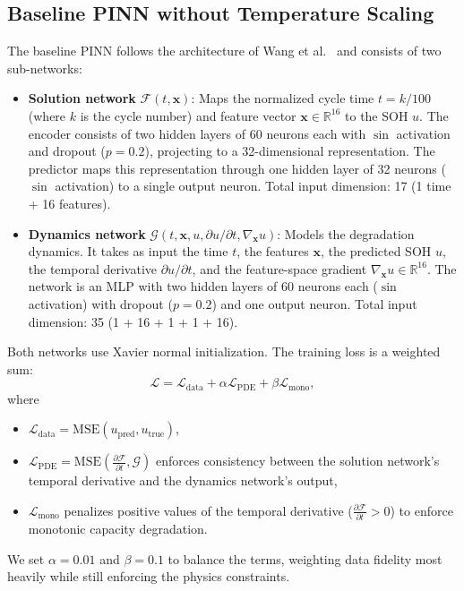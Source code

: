 \documentclass[conference]{IEEEtran}
\begin{document}
\subsection{Baseline PINN without Temperature Scaling}
The baseline PINN follows the architecture of Wang et al.~\cite{wang2024physics} and consists of two sub-networks:
\begin{itemize}
    \item \textbf{Solution network} \(\mathcal{F}(t, \mathbf{x})\): Maps the normalized cycle time \(t = k/100\) (where \(k\) is the cycle number) and feature vector \(\mathbf{x} \in \mathbb{R}^{16}\) to the SOH \(u\). The encoder consists of two hidden layers of 60 neurons each with \(\sin\) activation and dropout (\(p=0.2\)), projecting to a 32-dimensional representation. The predictor maps this representation through one hidden layer of 32 neurons (\(\sin\) activation) to a single output neuron. Total input dimension: 17 (1 time + 16 features).
    \item \textbf{Dynamics network} \(\mathcal{G}(t, \mathbf{x}, u, \partial u / \partial t, \nabla_{\mathbf{x}} u)\): Models the degradation dynamics. It takes as input the time \(t\), the features \(\mathbf{x}\), the predicted SOH \(u\), the temporal derivative \(\partial u / \partial t\), and the feature-space gradient \(\nabla_{\mathbf{x}} u \in \mathbb{R}^{16}\). The network is an MLP with two hidden layers of 60 neurons each (\(\sin\) activation) with dropout (\(p=0.2\)) and one output neuron. Total input dimension: 35 (1 + 16 + 1 + 1 + 16).
\end{itemize}
Both networks use Xavier normal initialization. The training loss is a weighted sum:
\[
\mathcal{L} = \mathcal{L}_{\text{data}} + \alpha \mathcal{L}_{\text{PDE}} + \beta \mathcal{L}_{\text{mono}},
\]
where
\begin{itemize}
    \item \(\mathcal{L}_{\text{data}} = \text{MSE}(u_{\text{pred}}, u_{\text{true}})\),
    \item \(\mathcal{L}_{\text{PDE}} = \text{MSE}\left(\frac{\partial \mathcal{F}}{\partial t}, \mathcal{G}\right)\) enforces consistency between the solution network's temporal derivative and the dynamics network's output,
    \item \(\mathcal{L}_{\text{mono}}\) penalizes positive values of the temporal derivative (\(\frac{\partial \mathcal{F}}{\partial t} > 0\)) to enforce monotonic capacity degradation.
\end{itemize}
We set \(\alpha = 0.01\) and \(\beta = 0.1\) to balance the terms, weighting data fidelity most heavily while still enforcing the physics constraints.
\end{document}
